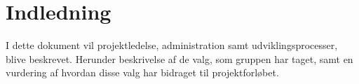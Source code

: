 \section{Indledning}

I dette dokument vil projektledelse, administration samt udviklingsprocesser, blive beskrevet. Herunder beskrivelse af de valg, som gruppen har taget, samt en vurdering af hvordan disse valg har bidraget til projektforløbet.